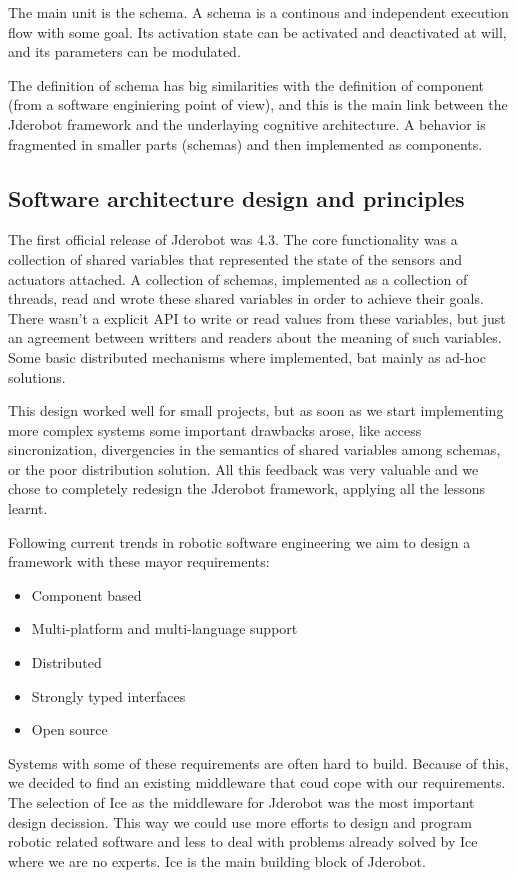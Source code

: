 \documentclass[twocolumn]{svjour3}          %
\begin{document}
The main unit is the schema. A schema is a continous and independent execution flow with some goal. Its activation state can be activated and deactivated at will, and its parameters can be modulated.

The definition of schema has big similarities with the definition of component (from a software enginiering point of view), and this is the main link between the Jderobot framework and the underlaying cognitive architecture. A behavior is fragmented in smaller parts (schemas) and then implemented as components.

\subsection{Software architecture design and principles}

The first official release of Jderobot was 4.3. The core functionality was a collection of shared variables that represented the state of the sensors and actuators attached. A collection of schemas, implemented as a collection of threads, read and wrote these shared variables in order to achieve their goals. There wasn't a explicit API to write or read values from these variables, but just an agreement between writters and readers about the meaning of such variables. Some basic distributed mechanisms where implemented, bat mainly as ad-hoc solutions.

This design worked well for small projects, but as soon as we start implementing more complex systems some important drawbacks arose, like access sincronization, divergencies in the semantics of shared variables among schemas, or the poor distribution solution. All this feedback was very valuable and we chose to completely redesign the Jderobot framework, applying all the lessons learnt.

Following current trends in robotic software engineering we aim to design a framework with these mayor requirements:
\begin{itemize}
\item Component based
\item Multi-platform and multi-language support
\item Distributed
\item Strongly typed interfaces
\item Open source
\end{itemize}

Systems with some of these requirements are often hard to build. Because of this, we decided to find an existing middleware that coud cope with our requirements. The selection of Ice as the middleware for Jderobot was the most important design decission. This way we could use more efforts to design and program robotic related software and less to deal with problems already solved by Ice where we are no experts. Ice is the main building block of Jderobot.
\end{document}
